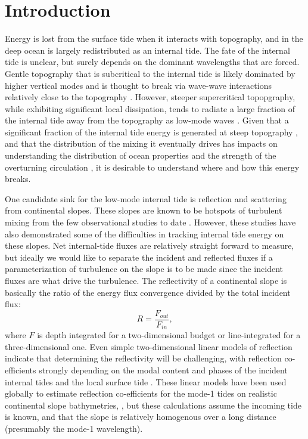 \documentclass[10pt]{article}
\begin{document}
\section{Introduction}


Energy is lost from the surface tide when it interacts with topography, and in the deep ocean is largely redistributed as an internal tide.  The fate of the internal tide is unclear, but surely depends on the dominant wavelengths that are forced.  Gentle topography that is subcritical to the internal tide is likely dominated by higher vertical modes and is thought to break via wave-wave interactions relatively close to the topography \citep[i.e.][]{polzin09,stlaurentgarrett02}.  However, steeper supercritical topopgraphy, while exhibiting significant local dissipation, tends to radiate a large fraction of the internal tide away from the topography as low-mode waves \citep[i.e. at Hawaii][]{klymaketal06b,carteretal08}.  Given that a significant fraction of the internal tide energy is generated at steep topography \citep{leggklymak08}, and that the distribution of the mixing it eventually drives has impacts on understanding the distribution of ocean properties and the strength of the overturning circulation \citep[i.e.][]{meletetal13}, it is desirable to understand where and how this energy breaks.

One candidate sink for the low-mode internal tide is reflection and scattering from continental slopes.  These slopes are known to be hotspots of turbulent mixing from the few observational studies to date \citep{nashetal07,klymaketal11a,martinietal13}.  However, these studies have also demonstrated some of the difficulties in tracking internal tide energy on these slopes.  Net internal-tide fluxes are relatively straight forward to measure, but ideally we would like to separate the incident and reflected fluxes if a parameterization of turbulence on the slope is to be made since the incident fluxes are what drive the turbulence.  The reflectivity of a continental slope is basically the ratio of the energy flux convergence divided by the total incident flux: 
$$ R = \frac{F_{out}}{F_{in}}, $$ 
where $F$ is depth integrated for a two-dimensional budget or line-integrated for a three-dimensional one.  Even simple two-dimensional linear models of reflection indicate that determining the reflectivity will be challenging, with reflection co-efficients strongly depending on the modal content and phases of the incident internal tides \citep{klymaketal11a} and the local surface tide \citep{kellynash10}.  These linear models have been used globally to estimate reflection co-efficients for the mode-1 tides on realistic continental slope bathymetries, \citep{kellyetal13,kellyetal13b}, but these calculations assume the incoming tide is known, and that the slope is relatively homogenous over a long distance (presumably the mode-1 wavelength).  
\end{document}
